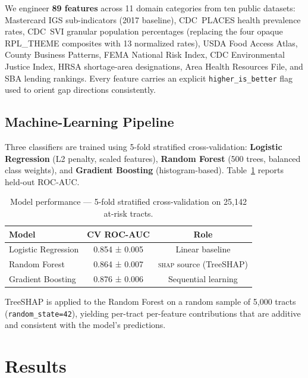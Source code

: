 \documentclass[10pt, letterpaper]{article}
\newcommand{\shap}{\textsc{shap}}
\begin{document}
We engineer \textbf{89 features} across 11 domain categories from ten
public datasets: Mastercard IGS sub-indicators (2017 baseline),
CDC~PLACES health prevalence rates, CDC~SVI granular population
percentages (replacing the four opaque RPL\_THEME composites with 13
normalized rates), USDA Food Access Atlas, County Business Patterns,
FEMA National Risk Index, CDC Environmental Justice Index, HRSA
shortage-area designations, Area Health Resources File, and SBA
lending rankings.  Every feature carries an explicit
\texttt{higher\_is\_better} flag used to orient gap directions
consistently.

\subsection{Machine-Learning Pipeline}

Three classifiers are trained using 5-fold stratified
cross-validation: \textbf{Logistic Regression} (L2 penalty, scaled
features), \textbf{Random Forest} (500 trees, balanced class weights),
and \textbf{Gradient Boosting} (histogram-based).
Table~\ref{tab:model} reports held-out ROC-AUC.

\begin{table}[h]
  \centering
  \small
  \caption{Model performance — 5-fold stratified cross-validation
    on 25,142 at-risk tracts.}
  \label{tab:model}
  \begin{tabular}{lcc}
    \toprule
    Model               & CV ROC-AUC    & Role \\
    \midrule
    Logistic Regression & 0.854 ± 0.005 & Linear baseline \\
    Random Forest       & 0.864 ± 0.007 & \shap{} source (TreeSHAP) \\
    Gradient Boosting   & 0.876 ± 0.006 & Sequential learning \\
    \bottomrule
  \end{tabular}
\end{table}

\noindent TreeSHAP is applied to the Random Forest on a random sample
of 5,000 tracts (\texttt{random\_state=42}), yielding per-tract
per-feature contributions that are additive and consistent with the
model's predictions.

\section{Results}
\end{document}
